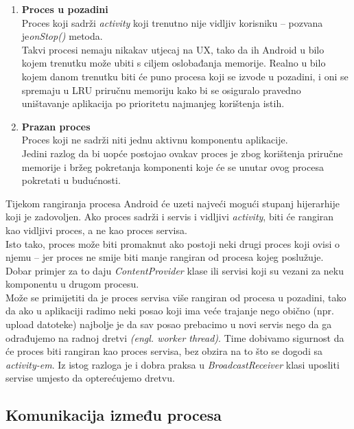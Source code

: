 \documentclass[times, utf8, zavrsni]{fer}
\begin{document}
\begin{enumerate}
\item
\textbf{Proces u pozadini}\\
Proces koji sadrži \textit{activity} koji trenutno nije vidljiv korisniku – pozvana je\linebreak \textit{onStop()} metoda.\\
Takvi procesi nemaju nikakav utjecaj na UX, tako da ih Android u bilo kojem trenutku može ubiti s ciljem oslobađanja memorije. Realno u bilo kojem danom trenutku biti će puno procesa koji se izvode u pozadini, i oni se spremaju u LRU priručnu memoriju kako bi se osiguralo pravedno uništavanje aplikacija po prioritetu najmanjeg korištenja istih.

\pagebreak
\item
\textbf{Prazan proces}\\
Proces koji ne sadrži niti jednu aktivnu komponentu aplikacije.\\
Jedini razlog da bi uopće postojao ovakav proces je zbog korištenja priručne memorije i bržeg pokretanja komponenti koje će se unutar ovog procesa pokretati u budućnosti.

\end{enumerate}

Tijekom rangiranja procesa Android će uzeti najveći mogući stupanj hijerarhije koji je zadovoljen. Ako proces sadrži i servis i vidljivi \textit{activity}, biti će rangiran kao vidljivi proces, a ne kao proces servisa.\\

Isto tako, proces može biti promaknut ako postoji neki drugi proces koji ovisi o njemu – jer proces ne smije biti manje rangiran od procesa kojeg poslužuje. Dobar primjer za to daju \textit{ContentProvider} klase ili servisi koji su vezani za neku komponentu u drugom procesu.\\

Može se primijetiti da je proces servisa više rangiran od procesa u pozadini, tako da ako u aplikaciji radimo neki posao koji ima veće trajanje nego obično (npr. upload datoteke) najbolje je da sav posao prebacimo u novi servis nego da ga odrađujemo na radnoj dretvi \textit{(engl. worker thread)}. Time dobivamo sigurnost da će proces biti rangiran kao proces servisa, bez obzira na to što se dogodi sa \textit{activity-em}. Iz istog razloga je i dobra praksa u \textit{BroadcastReceiver} klasi uposliti servise umjesto da opterećujemo dretvu.

\subsection{Komunikacija između procesa}
\end{document}
